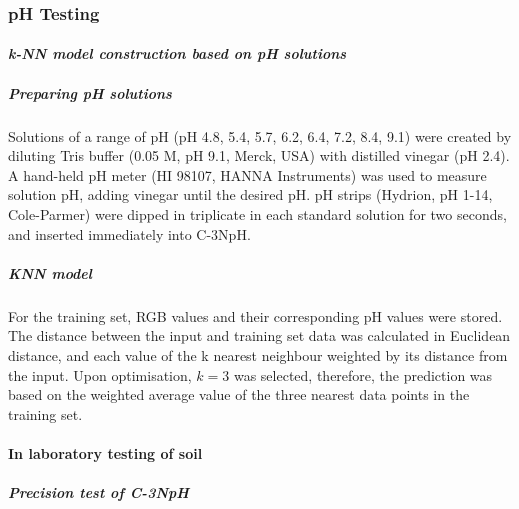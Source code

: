 \subsubsection{pH Testing}
\paragraph{\textit{k-NN model construction based on pH solutions}} \label{phproto}

\subparagraph{Preparing pH solutions} 

\noindent Solutions of a range of pH (pH 4.8, 5.4, 5.7, 6.2, 6.4, 7.2, 8.4, 9.1) were created by diluting Tris buffer (0.05 M, pH 9.1, Merck, USA) with %
distilled vinegar (pH 2.4). A hand-held pH meter (HI 98107, HANNA Instruments) was used to measure solution pH, adding vinegar until the desired pH. pH strips (Hydrion, pH 1-14, Cole-Parmer) were dipped in triplicate in each standard solution for two seconds, and inserted immediately into C-3NpH.

\subparagraph{\gls{KNN} model} 

\noindent For the training set, RGB values and their corresponding pH values were stored. The distance between the input and training set data was calculated in Euclidean distance, and each value of the k nearest neighbour weighted by its distance from the input. Upon optimisation, $k = 3$ was selected, therefore, the prediction was based on the weighted average value of the three nearest data points in the training set. 



\paragraph{In laboratory testing of soil}


\subparagraph{Precision test of C-3NpH}


